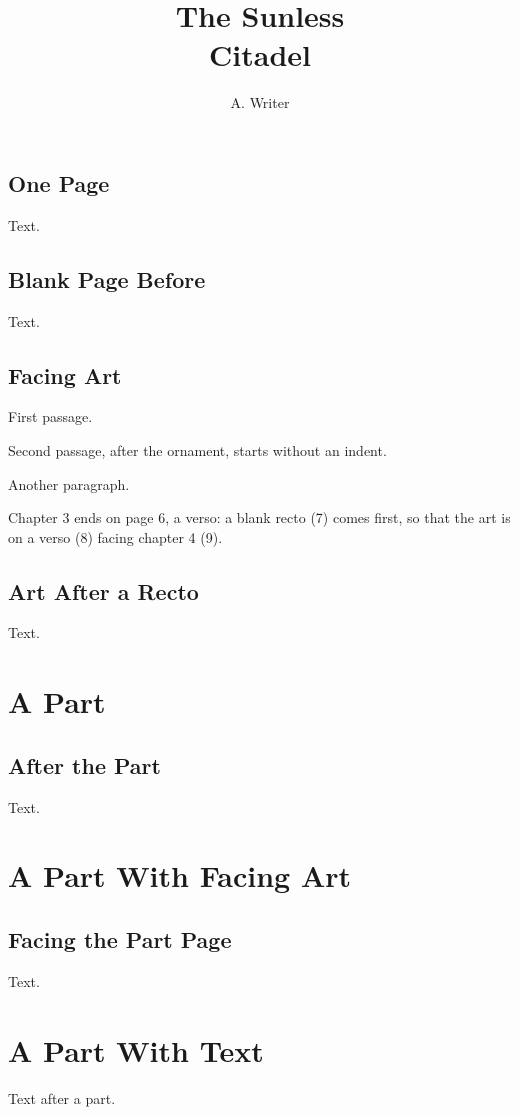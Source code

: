 \documentclass[letterpaper,twoside,twocolumn,openright,nodeprecatedcode]{dndbook}
\title{The Sunless\\Citadel}
\author{A. Writer}
\begin{document}
\frontmatter
\maketitle                 %
\tableofcontents           %

\mainmatter

\chapter{One Page}
Text.

\chapter{Blank Page Before}
Text.

\chapter{Facing Art}
First passage.

\DndSectionBreak

Second passage, after the ornament, starts without an indent.

Another paragraph.

\clearpage
Chapter 3 ends on page 6, a verso: a blank recto (7) comes first, so that
the art is on a verso (8) facing chapter 4 (9).

\chapter{Art After a Recto}
Text.

\part{A Part}

\chapter{After the Part}
Text.

\part{A Part With Facing Art}
\label{part:facing}
\chapter{Facing the Part Page}
Text.

\part{A Part With Text}
Text after a part.
\end{document}
